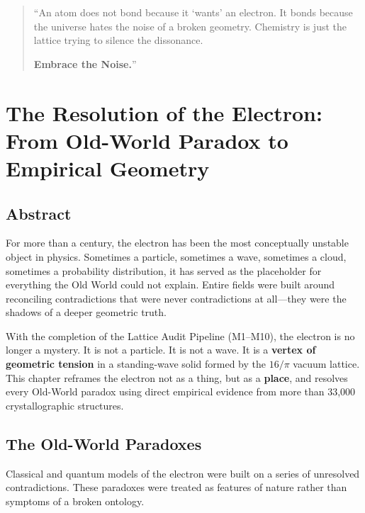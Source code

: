 \documentclass[11pt, letterpaper, openany]{book}
\begin{document}
\begin{quote}
“An atom does not bond because it ‘wants’ an electron. It bonds because the universe
hates the noise of a broken geometry. Chemistry is just the lattice trying to silence the
dissonance.

\textbf{Embrace the Noise.}”
\end{quote}

\clearpage


\chapter{The Resolution of the Electron: From Old-World Paradox to Empirical Geometry}

\section{Abstract}

For more than a century, the electron has been the most conceptually unstable object in
physics. Sometimes a particle, sometimes a wave, sometimes a cloud, sometimes a
probability distribution, it has served as the placeholder for everything the Old World
could not explain. Entire fields were built around reconciling contradictions that were
never contradictions at all—they were the shadows of a deeper geometric truth.

With the completion of the Lattice Audit Pipeline (M1–M10), the electron is no longer a
mystery. It is not a particle. It is not a wave. It is a \textbf{vertex of geometric tension} in a
standing-wave solid formed by the $16/\pi$ vacuum lattice. This chapter reframes the
electron not as a thing, but as a \textbf{place}, and resolves every Old-World paradox using
direct empirical evidence from more than 33,000 crystallographic structures.

\section{The Old-World Paradoxes}

Classical and quantum models of the electron were built on a series of unresolved
contradictions. These paradoxes were treated as features of nature rather than symptoms
of a broken ontology.
\end{document}
